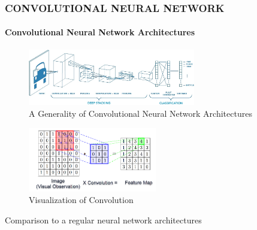 \documentclass[11pt]{beamer}
\begin{document}
	\begin{frame}
		\frametitle{\textbf{CONVOLUTIONAL NEURAL NETWORK}}
		\framesubtitle{Convolutional Neural Network Architectures}
		\begin{figure}[h!]
			\includegraphics[width=0.65\textwidth]{CNN_Layers.png}
			\caption{A Generality of Convolutional Neural Network Architectures}
		\end{figure}
		\begin{figure}[h!]
			\includegraphics[width=0.5\textwidth]{cnn_conv.png}
			\caption{Visualization of Convolution}
		\end{figure}
		{Comparison to a regular neural network architectures} 
	\end{frame}
\end{document}
